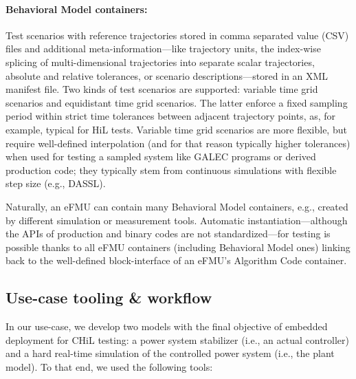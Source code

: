 \paragraph{Behavioral Model containers:} Test scenarios with reference trajectories stored in comma separated value (CSV) files and additional meta-information---like trajectory units, the index-wise splicing of multi-dimensional trajectories into separate scalar trajectories, absolute and relative tolerances, or scenario descriptions---stored in an XML manifest file. Two kinds of test scenarios are supported: variable time grid scenarios and equidistant time grid scenarios. The latter enforce a fixed sampling period within strict time tolerances between adjacent trajectory points, as, for example, typical for HiL tests. Variable time grid scenarios are more flexible, but require well-defined interpolation (and for that reason typically higher tolerances) when used for testing a sampled system like GALEC programs or derived production code; they typically stem from continuous simulations with flexible step size (e.g., DASSL).

Naturally, an eFMU can contain many Behavioral Model containers, e.g., created by different simulation or measurement tools. Automatic instantiation---although the APIs of production and binary codes are not standardized---for testing is possible thanks to all eFMU containers (including Behavioral Model ones) linking back to the well-defined block-interface of an eFMU's Algorithm Code container.

\subsection{Use-case tooling \& workflow}

In our use-case, we develop two models with the final objective of embedded deployment for CHiL testing: a power system stabilizer (i.e., an actual controller) and a hard real-time simulation of the controlled power system (i.e., the plant model). To that end, we used the following tools:

